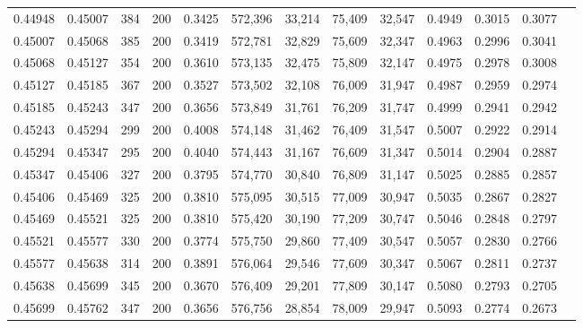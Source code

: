 \begin{tabular}{rrrrrrrrrrrrr}
0.44948 & 0.45007 &    384 & 200 &                                     0.3425 & 572,396 &  33,214 &  75,409 &  32,547 & 0.4949 & 0.3015 & 0.3077 \\
0.45007 & 0.45068 &    385 & 200 &                                     0.3419 & 572,781 &  32,829 &  75,609 &  32,347 & 0.4963 & 0.2996 & 0.3041 \\
0.45068 & 0.45127 &    354 & 200 &                                     0.3610 & 573,135 &  32,475 &  75,809 &  32,147 & 0.4975 & 0.2978 & 0.3008 \\
0.45127 & 0.45185 &    367 & 200 &                                     0.3527 & 573,502 &  32,108 &  76,009 &  31,947 & 0.4987 & 0.2959 & 0.2974 \\
0.45185 & 0.45243 &    347 & 200 &                                     0.3656 & 573,849 &  31,761 &  76,209 &  31,747 & 0.4999 & 0.2941 & 0.2942 \\
0.45243 & 0.45294 &    299 & 200 &                                     0.4008 & 574,148 &  31,462 &  76,409 &  31,547 & 0.5007 & 0.2922 & 0.2914 \\
0.45294 & 0.45347 &    295 & 200 &                                     0.4040 & 574,443 &  31,167 &  76,609 &  31,347 & 0.5014 & 0.2904 & 0.2887 \\
0.45347 & 0.45406 &    327 & 200 &                                     0.3795 & 574,770 &  30,840 &  76,809 &  31,147 & 0.5025 & 0.2885 & 0.2857 \\
0.45406 & 0.45469 &    325 & 200 &                                     0.3810 & 575,095 &  30,515 &  77,009 &  30,947 & 0.5035 & 0.2867 & 0.2827 \\
0.45469 & 0.45521 &    325 & 200 &                                     0.3810 & 575,420 &  30,190 &  77,209 &  30,747 & 0.5046 & 0.2848 & 0.2797 \\
0.45521 & 0.45577 &    330 & 200 &                                     0.3774 & 575,750 &  29,860 &  77,409 &  30,547 & 0.5057 & 0.2830 & 0.2766 \\
0.45577 & 0.45638 &    314 & 200 &                                     0.3891 & 576,064 &  29,546 &  77,609 &  30,347 & 0.5067 & 0.2811 & 0.2737 \\
0.45638 & 0.45699 &    345 & 200 &                                     0.3670 & 576,409 &  29,201 &  77,809 &  30,147 & 0.5080 & 0.2793 & 0.2705 \\
0.45699 & 0.45762 &    347 & 200 &                                     0.3656 & 576,756 &  28,854 &  78,009 &  29,947 & 0.5093 & 0.2774 & 0.2673 \\

\end{tabular}

